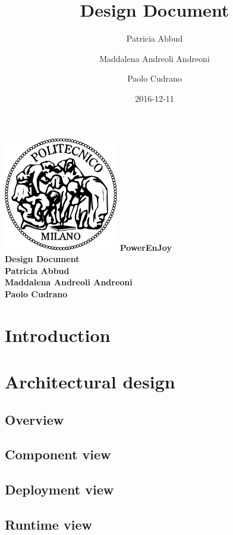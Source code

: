 \documentclass[12pt, a4paper]{article}
\title{Design Document}
\date{2016-12-11}
\author{
	Patricia Abbud
	\and
	Maddalena Andreoli Andreoni
	\and
	Paolo Cudrano
}
\begin{document}
	\begin{titlepage}
		\centering
		\includegraphics[width=5cm]{img/polimi_logo.png} %
		\vfill
		{\bfseries\Large
			PowerEnJoy\\
			Design Document\\
			\vskip4cm
			Patricia Abbud\\
			Maddalena Andreoli Andreoni\\
			Paolo Cudrano\\
		}
		\vfill
		\vfill
	\end{titlepage}

	\tableofcontents
	\newpage

	\section{Introduction}
		

	\newpage
	\section{Architectural design}
		\subsection{Overview}
			

		\subsection{Component view}
			

		\subsection{Deployment view}
			

		\subsection{Runtime view}
			
\end{document}
